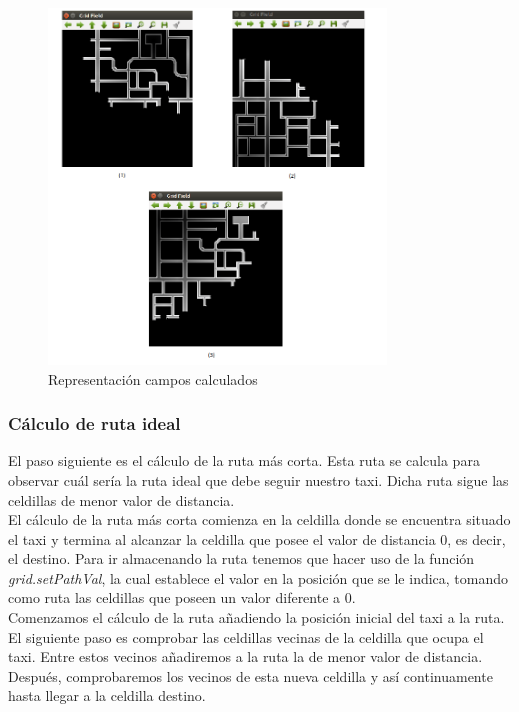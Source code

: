 \begin{figure}[H]
  \begin{center}
    \includegraphics[width=0.8\textwidth]{figures/GPP/campos.png}
		\caption{Representación campos calculados}
		\label{fig.campos_gpp}
		\end{center}
\end{figure}

\subsubsection{Cálculo de ruta ideal}
El paso siguiente es el cálculo de la ruta más corta. Esta ruta se calcula para observar cuál sería la ruta ideal que debe seguir nuestro taxi. Dicha ruta sigue las celdillas de menor valor de distancia.\\


El cálculo de la ruta más corta comienza en la celdilla donde se encuentra situado el taxi y termina al alcanzar la celdilla que posee el valor de distancia 0, es decir, el destino. Para ir almacenando la ruta tenemos que hacer uso de la función \textit{grid.setPathVal}, la cual establece el valor en la posición que se le indica, tomando como ruta las celdillas que poseen un valor diferente a 0. \\

Comenzamos el cálculo de la ruta añadiendo la posición inicial del taxi a la ruta. El siguiente paso es comprobar las celdillas vecinas de la celdilla que ocupa el taxi. Entre estos vecinos añadiremos a la ruta la de menor valor de distancia. Después, comprobaremos los vecinos de esta nueva celdilla y así continuamente hasta llegar a la celdilla destino.\\

